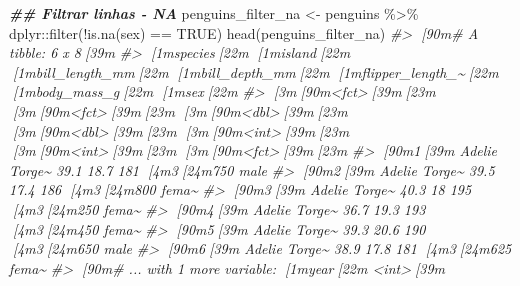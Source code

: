 \documentclass[
]{book}
\newenvironment{Shaded}{\begin{snugshade}}{\end{snugshade}}
\newcommand{\CommentTok}[1]{\textcolor[rgb]{0.37,0.37,0.37}{\textit{#1}}}
\newcommand{\ConstantTok}[1]{\textcolor[rgb]{0,0,0}{#1}}
\newcommand{\DocumentationTok}[1]{\textcolor[rgb]{0.37,0.37,0.37}{\textbf{\textit{#1}}}}
\newcommand{\FunctionTok}[1]{\textcolor[rgb]{0,0,0}{#1}}
\newcommand{\NormalTok}[1]{#1}
\newcommand{\OtherTok}[1]{\textcolor[rgb]{0.37,0.37,0.37}{#1}}
\newcommand{\SpecialCharTok}[1]{\textcolor[rgb]{0,0,0}{#1}}
\begin{document}
\begin{Shaded}
\begin{Highlighting}[]
\DocumentationTok{\#\# Filtrar linhas {-} NA}
\NormalTok{penguins\_filter\_na }\OtherTok{\textless{}{-}}\NormalTok{ penguins }\SpecialCharTok{\%\textgreater{}\%} 
\NormalTok{  dplyr}\SpecialCharTok{::}\FunctionTok{filter}\NormalTok{(}\SpecialCharTok{!}\FunctionTok{is.na}\NormalTok{(sex) }\SpecialCharTok{==} \ConstantTok{TRUE}\NormalTok{)}
\FunctionTok{head}\NormalTok{(penguins\_filter\_na)}
\CommentTok{\#\textgreater{} [90m\# A tibble: 6 x 8[39m}
\CommentTok{\#\textgreater{}   [1mspecies[22m [1misland[22m [1mbill\_length\_mm[22m [1mbill\_depth\_mm[22m [1mflipper\_length\_\textasciitilde{}[22m [1mbody\_mass\_g[22m [1msex[22m  }
\CommentTok{\#\textgreater{}   [3m[90m\textless{}fct\textgreater{}[39m[23m   [3m[90m\textless{}fct\textgreater{}[39m[23m           [3m[90m\textless{}dbl\textgreater{}[39m[23m         [3m[90m\textless{}dbl\textgreater{}[39m[23m            [3m[90m\textless{}int\textgreater{}[39m[23m       [3m[90m\textless{}int\textgreater{}[39m[23m [3m[90m\textless{}fct\textgreater{}[39m[23m}
\CommentTok{\#\textgreater{} [90m1[39m Adelie  Torge\textasciitilde{}           39.1          18.7              181        [4m3[24m750 male }
\CommentTok{\#\textgreater{} [90m2[39m Adelie  Torge\textasciitilde{}           39.5          17.4              186        [4m3[24m800 fema\textasciitilde{}}
\CommentTok{\#\textgreater{} [90m3[39m Adelie  Torge\textasciitilde{}           40.3          18                195        [4m3[24m250 fema\textasciitilde{}}
\CommentTok{\#\textgreater{} [90m4[39m Adelie  Torge\textasciitilde{}           36.7          19.3              193        [4m3[24m450 fema\textasciitilde{}}
\CommentTok{\#\textgreater{} [90m5[39m Adelie  Torge\textasciitilde{}           39.3          20.6              190        [4m3[24m650 male }
\CommentTok{\#\textgreater{} [90m6[39m Adelie  Torge\textasciitilde{}           38.9          17.8              181        [4m3[24m625 fema\textasciitilde{}}
\CommentTok{\#\textgreater{} [90m\# ... with 1 more variable: [1myear[22m \textless{}int\textgreater{}[39m}


\end{Highlighting}
\end{Shaded}
\end{document}
